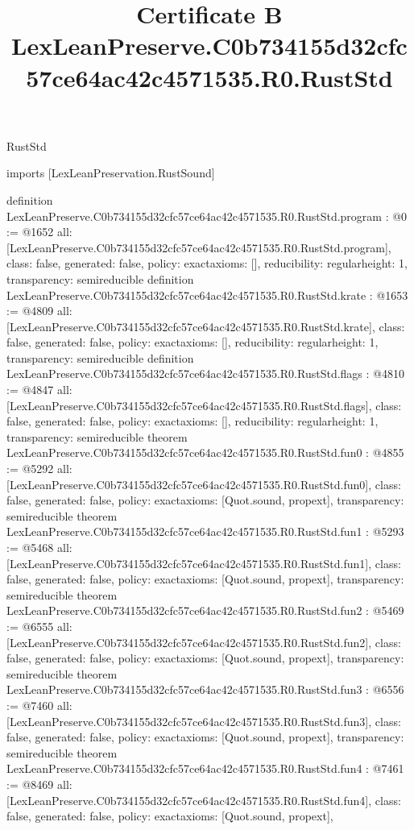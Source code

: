 \begin{lexlean}{RustStd}
\title{Certificate B LexLeanPreserve.C0b734155d32cfc57ce64ac42c4571535.R0.RustStd}
\begin{coremodule}
imports [LexLeanPreservation.RustSound]

definition LexLeanPreserve.C0b734155d32cfc57ce64ac42c4571535.R0.RustStd.program : @0 := @1652 {
  all: [LexLeanPreserve.C0b734155d32cfc57ce64ac42c4571535.R0.RustStd.program],
  class: false,
  generated: false,
  policy: exact{axioms: []},
  reducibility: regular{height: 1},
  transparency: semireducible
}
definition LexLeanPreserve.C0b734155d32cfc57ce64ac42c4571535.R0.RustStd.krate : @1653 := @4809 {
  all: [LexLeanPreserve.C0b734155d32cfc57ce64ac42c4571535.R0.RustStd.krate],
  class: false,
  generated: false,
  policy: exact{axioms: []},
  reducibility: regular{height: 1},
  transparency: semireducible
}
definition LexLeanPreserve.C0b734155d32cfc57ce64ac42c4571535.R0.RustStd.flags : @4810 := @4847 {
  all: [LexLeanPreserve.C0b734155d32cfc57ce64ac42c4571535.R0.RustStd.flags],
  class: false,
  generated: false,
  policy: exact{axioms: []},
  reducibility: regular{height: 1},
  transparency: semireducible
}
theorem LexLeanPreserve.C0b734155d32cfc57ce64ac42c4571535.R0.RustStd.fun0 : @4855 := @5292 {
  all: [LexLeanPreserve.C0b734155d32cfc57ce64ac42c4571535.R0.RustStd.fun0],
  class: false,
  generated: false,
  policy: exact{axioms: [Quot.sound, propext]},
  transparency: semireducible
}
theorem LexLeanPreserve.C0b734155d32cfc57ce64ac42c4571535.R0.RustStd.fun1 : @5293 := @5468 {
  all: [LexLeanPreserve.C0b734155d32cfc57ce64ac42c4571535.R0.RustStd.fun1],
  class: false,
  generated: false,
  policy: exact{axioms: [Quot.sound, propext]},
  transparency: semireducible
}
theorem LexLeanPreserve.C0b734155d32cfc57ce64ac42c4571535.R0.RustStd.fun2 : @5469 := @6555 {
  all: [LexLeanPreserve.C0b734155d32cfc57ce64ac42c4571535.R0.RustStd.fun2],
  class: false,
  generated: false,
  policy: exact{axioms: [Quot.sound, propext]},
  transparency: semireducible
}
theorem LexLeanPreserve.C0b734155d32cfc57ce64ac42c4571535.R0.RustStd.fun3 : @6556 := @7460 {
  all: [LexLeanPreserve.C0b734155d32cfc57ce64ac42c4571535.R0.RustStd.fun3],
  class: false,
  generated: false,
  policy: exact{axioms: [Quot.sound, propext]},
  transparency: semireducible
}
theorem LexLeanPreserve.C0b734155d32cfc57ce64ac42c4571535.R0.RustStd.fun4 : @7461 := @8469 {
  all: [LexLeanPreserve.C0b734155d32cfc57ce64ac42c4571535.R0.RustStd.fun4],
  class: false,
  generated: false,
  policy: exact{axioms: [Quot.sound, propext]},
}
\end{coremodule}
\end{lexlean}
